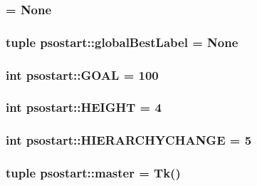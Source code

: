 \hypertarget{namespacepsostart_a4626f705c0ad45f935cbdc017503911}{
\subsubsection{ = None}}
\label{namespacepsostart_a4626f705c0ad45f935cbdc017503911}


\hypertarget{namespacepsostart_16120c58348b037f3026552129c4a703}{
\subsubsection{\setlength{\rightskip}{0pt plus 5cm}tuple {\bf psostart::globalBestLabel} = None}}
\label{namespacepsostart_16120c58348b037f3026552129c4a703}


\hypertarget{namespacepsostart_4baead81c8a51f0adb3699b010c3c02d}{
\subsubsection{\setlength{\rightskip}{0pt plus 5cm}int {\bf psostart::GOAL} = 100}}
\label{namespacepsostart_4baead81c8a51f0adb3699b010c3c02d}


\hypertarget{namespacepsostart_3169f3551a7343c45c9e96aa8b60666d}{
\subsubsection{\setlength{\rightskip}{0pt plus 5cm}int {\bf psostart::HEIGHT} = 4}}
\label{namespacepsostart_3169f3551a7343c45c9e96aa8b60666d}


\hypertarget{namespacepsostart_869ea53446100d3296786868d2c17965}{
\subsubsection{\setlength{\rightskip}{0pt plus 5cm}int {\bf psostart::HIERARCHYCHANGE} = 5}}
\label{namespacepsostart_869ea53446100d3296786868d2c17965}


\hypertarget{namespacepsostart_6f96baa861a0624d8fc7f23a25059d9f}{
\subsubsection{\setlength{\rightskip}{0pt plus 5cm}tuple {\bf psostart::master} = Tk()}}
\label{namespacepsostart_6f96baa861a0624d8fc7f23a25059d9f}


